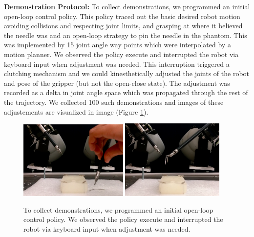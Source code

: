 \vspace{0.5em} \noindent \textbf{Demonstration Protocol: }
To collect demonstrations, we programmed an initial open-loop control policy. This policy traced out the basic desired robot motion avoiding collisions and respecting joint limits, and grasping at where it believed the needle was and an open-loop strategy to pin the needle in the phantom.
This was implemented by 15 joint angle way points which were interpolated by a motion planner.
We observed the policy execute and interrupted the robot via keyboard input when adjustment was needed.
This interruption triggered a clutching mechanism and we could 
kinesthetically adjusted the joints of the robot and pose of the gripper (but not the open-close state).
The adjustment was recorded as a delta in joint angle space which was propagated through the rest of the trajectory.
We collected 100 such demonstrations and images of these adjustements are visualized in image (Figure \ref{fig:demo}).

  \begin{figure}[ht!]
    \centering
    \includegraphics[width=0.48\textwidth]{ddco-experiments/demo-1.png}
    \includegraphics[width=0.455\textwidth]{ddco-experiments/demo-2.png}
    \caption{To collect demonstrations, we programmed an initial open-loop control policy. We observed the policy execute and interrupted the robot via keyboard input when adjustment was needed.  \label{fig:demo}}
\end{figure}


